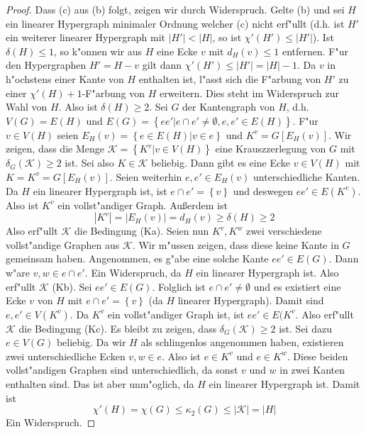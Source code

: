 \begin{proof}
  Dass (c) aus (b) folgt, zeigen wir durch Widerspruch. Gelte (b) und sei $H$ ein linearer Hypergraph minimaler Ordnung welcher (c) nicht erf"ullt (d.h. ist $H'$ ein weiterer linearer Hypergraph mit $|H'| < |H|$, so ist $\chi'(H') \leq | H'|$). Ist $\delta(H) \leq 1$, so k"onnen wir aus $H$ eine Ecke $v$ mit $d_H(v) \leq 1$ entfernen. F"ur den Hypergraphen $H' = H - v $ gilt dann $\chi'(H') \leq |H'| = |H|-1$. Da $v$ in h"ochstens einer Kante von $H$ enthalten ist, l"asst sich die F"arbung
  von $H'$ zu einer $\chi'(H) +1$-F"arbung von $H$ erweitern.
  Dies steht im Widerspruch zur Wahl von  $H$.  Also ist $\delta(H) \geq 2$. Sei $G$ der Kantengraph von $H$, d.h. $V(G) = E(H)$ und $E(G) = \left\{ ee'|e\cap e' \neq \emptyset, e,e' \in E(H) \right\}$. F"ur $v\in V(H)$ seien $E_{H}(v) = \left\{ e \in E(H) | v\in e \right\}$ und $K^{v} = G[E_H(v)]$.
  Wir zeigen, dass die Menge $\mathcal K = \left\{ K^{v}| v \in V(H) \right\}$ eine Krauszzerlegung von $G$  mit $\delta_{G}(\mathcal{K}) \geq 2$ ist.
  Sei also $K \in \mathcal{K} $ beliebig. Dann gibt es eine Ecke $v\in V(H)$ mit $K = K^{v} = G[E_{H}(v)]$. Seien weiterhin $e,e' \in E_H(v)$ unterschiedliche Kanten. Da $H$ ein linearer Hypergraph ist, ist $e\cap e' = \left\{ v \right\}$ und deswegen $ee'\in E(K^{v})$. Also ist $K^{v}$ ein vollst"andiger Graph.
  Au{\ss}erdem ist \begin{equation*}
    |K^{v}| = |E_{H}(v)|= d_{H}(v) \geq \delta(H) \geq 2
  \end{equation*}
  Also erf"ullt $\mathcal{K}$ die Bedingung (Ka). Seien nun $K^{v},K^{w}$ zwei verschiedene vollst"andige Graphen aus $\mathcal{K}$. Wir m"ussen zeigen, dass diese keine Kante in $G$ gemeinsam haben. Angenommen, es g"abe eine solche Kante $ee'\in E(G)$. Dann w"are $v,w \in e \cap e'$. Ein Widerspruch, da $H$ ein linearer Hypergraph ist. Also erf"ullt  $\mathcal{K}$ (Kb). Sei $ee'\in E(G)$. Folglich ist $e\cap e' \neq \emptyset$ und es existiert eine Ecke $v$ von $H$ mit $e \cap e ' = \left\{ v
  \right\}$ (da $H$ linearer Hypergraph). Damit sind $e,e'\in V(K^{v})$. Da $K^{v}$ ein vollst"andiger Graph ist, ist $ee'\in E(K^{v}$. Also erf"ullt $\mathcal{K}$ die Bedingung (Kc). 
  Es bleibt zu zeigen, dass $\delta_{G}(\mathcal{K}) \geq 2$ ist. Sei dazu $e \in V(G)$ beliebig. Da wir $H$ als schlingenlos angenommen haben, existieren zwei unterschiedliche Ecken $v,w \in e$. Also ist $e\in K^{v}$ und $e\in K^{w}$. Diese beiden vollst"andigen Graphen sind unterschiedlich, da sonst $v$ und $w$ in zwei Kanten enthalten sind.  Das ist aber unm"oglich, da $H$ ein linearer Hypergraph ist. 
  Damit ist \begin{equation*}
    \chi'(H) = \chi(G) \leq \kappa_{2}(G) \leq |\mathcal{K}| = |H|
  \end{equation*}
  Ein Widerspruch.
\end{proof}
